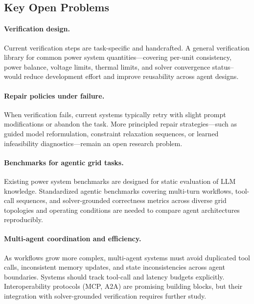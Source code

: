 \documentclass[journal,onecolumn]{IEEEtran} %
\begin{document}

\subsection{Key Open Problems}

\paragraph{Verification design.}
Current verification steps are task-specific and handcrafted. A general verification library for common power system quantities---covering per-unit consistency, power balance, voltage limits, thermal limits, and solver convergence status-- would reduce development effort and improve reusability across agent designs.

\paragraph{Repair policies under failure.}
When verification fails, current systems typically retry with slight prompt modifications or abandon the task. More principled repair strategies---such as guided model reformulation, constraint relaxation sequences, or learned
infeasibility diagnostics---remain an open research problem.

\paragraph{Benchmarks for agentic grid tasks.}
Existing power system benchmarks are designed for static evaluation of LLM knowledge. Standardized agentic benchmarks covering multi-turn workflows, tool-call sequences, and solver-grounded correctness metrics across diverse grid topologies and operating conditions are needed to compare agent architectures reproducibly.

\paragraph{Multi-agent coordination and efficiency.}
As workflows grow more complex, multi-agent systems must avoid duplicated tool calls, inconsistent memory updates, and state inconsistencies across agent boundaries. Systems should track tool-call and latency budgets explicitly. Interoperability protocols (MCP, A2A) are promising building blocks, but their integration with solver-grounded verification requires further study.
\end{document}
